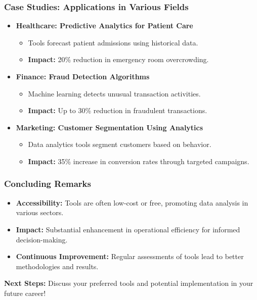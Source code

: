 \documentclass[aspectratio=169]{beamer}
\begin{document}
\begin{frame}[fragile]
    \frametitle{Case Studies: Applications in Various Fields}
    \begin{itemize}
        \item \textbf{Healthcare: Predictive Analytics for Patient Care}
        \begin{itemize}
            \item Tools forecast patient admissions using historical data.
            \item \textbf{Impact:} 20\% reduction in emergency room overcrowding.
        \end{itemize}

        \item \textbf{Finance: Fraud Detection Algorithms}
        \begin{itemize}
            \item Machine learning detects unusual transaction activities.
            \item \textbf{Impact:} Up to 30\% reduction in fraudulent transactions.
        \end{itemize}

        \item \textbf{Marketing: Customer Segmentation Using Analytics}
        \begin{itemize}
            \item Data analytics tools segment customers based on behavior.
            \item \textbf{Impact:} 35\% increase in conversion rates through targeted campaigns.
        \end{itemize}
    \end{itemize}
\end{frame}

\begin{frame}[fragile]
    \frametitle{Concluding Remarks}
    \begin{itemize}
        \item \textbf{Accessibility:} Tools are often low-cost or free, promoting data analysis in various sectors.
        \item \textbf{Impact:} Substantial enhancement in operational efficiency for informed decision-making.
        \item \textbf{Continuous Improvement:} Regular assessments of tools lead to better methodologies and results.
    \end{itemize}
    \textbf{Next Steps:} Discuss your preferred tools and potential implementation in your future career!
\end{frame}
\end{document}
